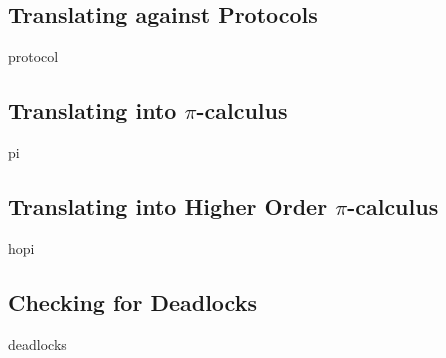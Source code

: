 \subsection{Translating against Protocols}
{protocol}

\subsection{Translating into \texorpdfstring{$\pi$}{pi}-calculus}
{pi}

\subsection{Translating into Higher Order \texorpdfstring{$\pi$}{pi}-calculus}
{hopi}

\subsection{Checking for Deadlocks}
{deadlocks}